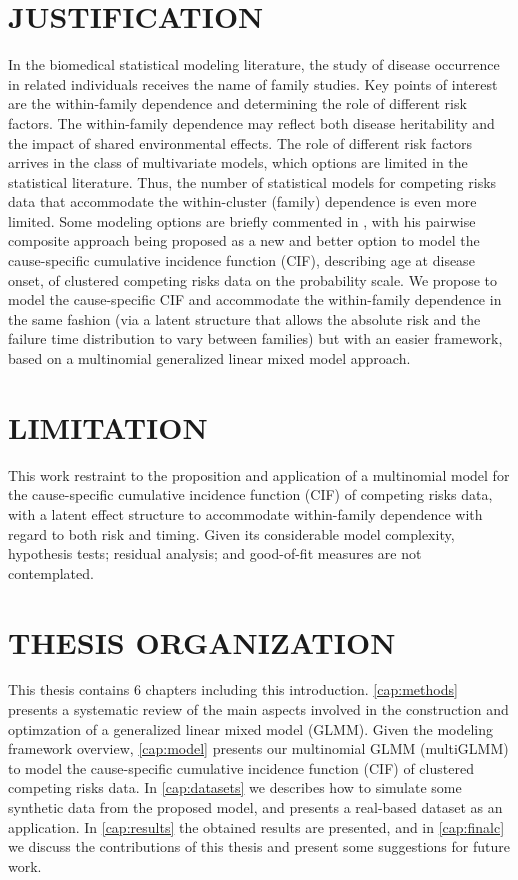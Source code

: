 \section{JUSTIFICATION}

In the biomedical statistical modeling literature, the study of disease
occurrence in related individuals receives the name of family studies.
Key points of interest are the within-family dependence and determining
the role of different risk factors. The within-family dependence may
reflect both disease heritability and the impact of shared environmental
effects. The role of different risk factors arrives in the class of
multivariate models, which options are limited in the statistical
literature. Thus, the number of statistical models for competing risks
data that accommodate the within-cluster (family) dependence is even
more limited. Some modeling options are briefly commented in
, with his pairwise composite approach being
proposed as a new and better option to model the cause-specific
cumulative incidence function (CIF), describing age at disease onset, of
clustered competing risks data on the probability scale. We propose to
model the cause-specific CIF and accommodate the within-family
dependence in the same fashion (via a latent structure that allows the
absolute risk and the failure time distribution to vary between
families) but with an easier framework, based on a multinomial
generalized linear mixed model approach.

\section{LIMITATION}

This work restraint to the proposition and application of a multinomial
model for the cause-specific cumulative incidence function (CIF) of
competing risks data, with a latent effect structure to accommodate
within-family dependence with regard to both risk and timing. Given its
considerable model complexity, hypothesis tests; residual analysis; and
good-of-fit measures are not contemplated.

\section{THESIS ORGANIZATION}

This thesis contains 6 chapters including this introduction.
\autoref{cap:methods} presents a systematic review of the main aspects
involved in the construction and optimzation of a generalized linear
mixed model (GLMM). Given the modeling framework overview,
\autoref{cap:model} presents our multinomial GLMM (multiGLMM) to model
the cause-specific cumulative incidence function (CIF) of clustered
competing risks data. In \autoref{cap:datasets} we describes how to
simulate some synthetic data from the proposed model, and presents a
real-based dataset as an application. In \autoref{cap:results} the
obtained results are presented, and in \autoref{cap:finalc} we discuss
the contributions of this thesis and present some suggestions for future
work.

